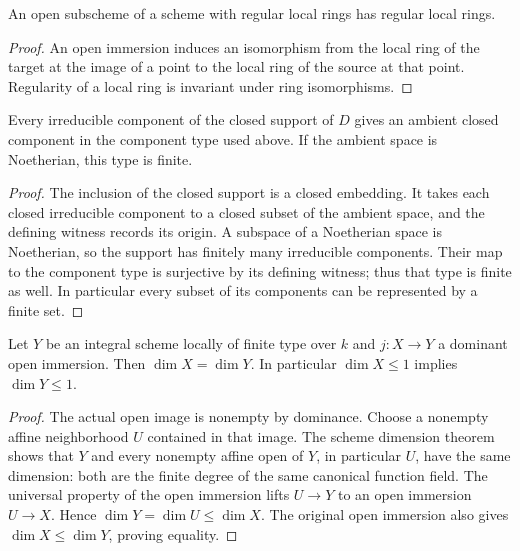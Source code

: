 \endgroup

\begingroup

\begin{lemma}
\label{lem:regular-open}
\leanok
An open subscheme of a scheme with regular local rings has regular local rings.
\end{lemma}
\begin{proof}
An open immersion induces an isomorphism from the local ring of the target
at the image of a point to the local ring of the source at that point.
Regularity of a local ring is invariant under ring isomorphisms.
\end{proof}

\endgroup

\begingroup

\begin{lemma}
\label{lem:divisor-components}
\leanok
Every irreducible component of the closed support of $D$ gives an ambient
closed component in the component type used above. If the ambient space is
Noetherian, this type is finite.
\end{lemma}
\begin{proof}
The inclusion of the closed support is a closed embedding. It takes each
closed irreducible component to a closed subset of the ambient space, and
the defining witness records its origin. A subspace of a Noetherian space
is Noetherian, so the support has finitely many irreducible components.
Their map to the component type is surjective by its defining witness;
thus that type is finite as well. In particular every subset of its
components can be represented by a finite set.
\end{proof}

\endgroup

\begingroup

\begin{corollary}
\label{cor:function-field-dimension-dense-open}
\leanok
Let $Y$ be an integral scheme locally of finite type over $k$ and
$j:X\to Y$ a dominant open immersion. Then $\dim X=\dim Y$.
In particular $\dim X\leq1$ implies $\dim Y\leq1$.
\end{corollary}
\begin{proof}
The actual open image is nonempty by dominance. Choose a nonempty
affine neighborhood $U$ contained in that image. The scheme dimension
theorem shows that $Y$ and every nonempty affine open of $Y$, in
particular $U$, have the same dimension: both are the finite degree of
the same canonical function field. The universal property of the open
immersion lifts $U\to Y$ to an open immersion $U\to X$. Hence
$\dim Y=\dim U\leq\dim X$. The original open immersion also gives
$\dim X\leq\dim Y$, proving equality.
\end{proof}

